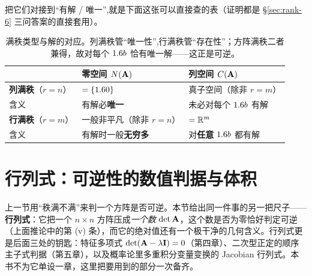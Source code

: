 
把它们对接到``有解 / 唯一'',就是下面这张可以直接查的表（证明都是 \S\ref{sec:rank-6} 三问答案的直接套用）。

\begin{table}[h]
\centering
\begin{tabular}{lll}
\toprule
& 零空间 $N(\mathbf{A})$ & 列空间 $C(\mathbf{A})$ \\
\midrule
\textbf{列满秩}（$r=n$） & $=\{1.6 0\}$ & 真子空间（除非 $r=m$）\\
含义 & 有解必\textbf{唯一} & 未必对每个 $1.6 b$ 有解 \\
\addlinespace
\textbf{行满秩}（$r=m$） & 一般非平凡（除非 $r=n$） & $=\mathbb{R}^m$ \\
含义 & 有解时一般\textbf{无穷多} & 对\textbf{任意} $1.6 b$ 都有解 \\
\bottomrule
\end{tabular}
\caption{满秩类型与解的对应。列满秩管``唯一性'',行满秩管``存在性''；方阵满秩二者兼得，故对每个 $1.6 b$ 恰有唯一解——这正是可逆。}
\label{tab:rank-1}
\end{table}


\section{行列式：可逆性的数值判据与体积}
\label{sec:rank-det}

上一节用``秩满不满''来判一个方阵是否可逆。本节给出同一件事的另一把尺子——\textbf{行列式}：它把一个 $n\times n$ 方阵压成\emph{一个数} $\det\mathbf{A}$，这个数是否为零恰好判定可逆（上面推论中的第 (v) 条），而它的绝对值还有一个极干净的几何含义。行列式更是后面三处的钥匙：特征多项式 $\det(\mathbf{A}-\lambda\mathbf{I})=0$（第四章）、二次型正定的顺序主子式判据（第五章），以及概率论里多重积分变量变换的 Jacobian 行列式。本书不为它单设一章，这里把要用到的部分一次备齐。

